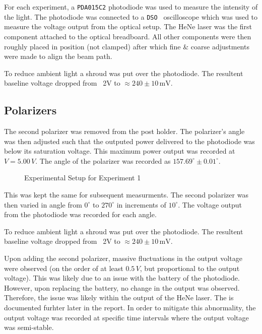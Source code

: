 \documentclass[aip, cp, amsmath, amssymb, reprint]{revtex4-2}
\begin{document}
        For each experiment, a \texttt{PDA015C2} photodiode was used to measure the intensity of the light. The photodiode was connected to a \texttt{DSO } oscilloscope which was used to measure the voltage output from the optical setup. The HeNe laser was the first component attached to the optical breadboard. All other components were then roughly placed in position (not clamped) after which fine \& coarse adjustments were made to align the beam path. 

        To reduce ambient light a shroud was put over the photodiode. The resultent baseline voltage dropped from ~2V to $\approx 240 \pm 10 \,\text{mV}$.

        \subsection{Polarizers}
            The second polarizer was removed from the post holder. The polarizer's angle was then adjusted such that the outputed power delivered to the photodiode was below its saturation voltage. This maximum power output was recorded at $V=5.00\,V$. The angle of the polarizer was recorded as $157.69^\circ \pm 0.01^\circ$. 
            
            \begin{figure}[H]
                \centering
                
                \caption{Experimental Setup for Experiment 1}
                \label{fig:exp1-setup}
            \end{figure}
            
            This was kept the same for subsequent measurments. The second polarizer was then varied in angle from $0^\circ$ to $270^\circ$ in increments of $10^\circ$. The voltage output from the photodiode was recorded for each angle.

            To reduce ambient light a shroud was put over the photodiode. The resultent baseline voltage dropped from ~2V to $\approx 240 \pm 10 \,\text{mV}$.

            Upon adding the second polarizer, massive fluctuations in the output voltage were observed (on the order of at least $0.5\,V$, but proportional to the output voltage). This was likely due to an issue with the battery of the photodiode. However, upon replacing the battery, no change in the output was observed. Therefore, the issue was likely within the output of the HeNe laser. The is documented furhter later in the report. In order to mitigate this abnormality, the output voltage was recorded at specific time intervals where the output voltage was semi-stable.
\end{document}
